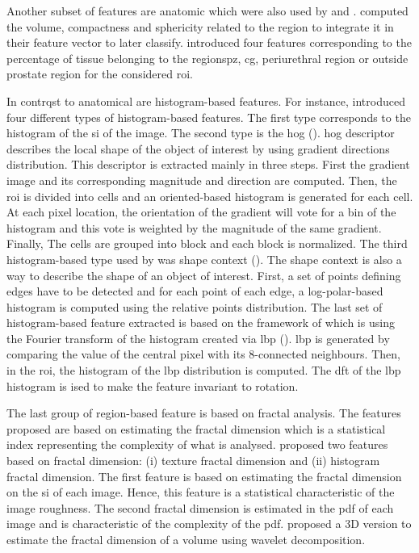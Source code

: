 \begin{enumerate}[leftmargin=*]
Another subset of features are anatomic which were also used by \cite{Litjens2012} and \cite{Matulewicz2013}. \cite{Litjens2012} computed the volume, compactness and sphericity related to the region to integrate it in their feature vector to later classify. \cite{Matulewicz2013} introduced four features corresponding to the percentage of tissue belonging to the regions\ac{pz}, \ac{cg}, periurethral region or outside prostate region for the considered \ac{roi}.

In contrqst to anatomical are histogram-based features. For instance, \cite{Liu2013} introduced four different types of histogram-based features. The first type corresponds to the histogram of the \ac{si} of the image. The second type is the \acf{hog} (\cite{Dalal2005}). \Ac{hog} descriptor describes the local shape of the object of interest by using gradient directions distribution. This descriptor is extracted mainly in three steps. First the gradient image and its corresponding magnitude and direction are computed. Then, the \ac{roi} is divided into cells and an oriented-based histogram is generated for each cell. At each pixel location, the orientation of the gradient will vote for a bin of the histogram and this vote is weighted by the magnitude of the same gradient. Finally, The cells are grouped into block and each block is normalized. The third histogram-based type used by \cite{Liu2013} was shape context (\cite{Belongie2002}). The shape context is also a way to describe the shape of an object of interest. First, a set of points defining edges have to be detected and for each point of each edge, a log-polar-based histogram is computed using the relative points distribution. The last set of histogram-based feature extracted is based on the framework of \cite{Zhao2012} which is using the Fourier transform of the histogram created via \acf{lbp} (\cite{Ojala1996}). \Ac{lbp} is generated by comparing the value of the central pixel with its 8-connected neighbours. Then, in the \ac{roi}, the histogram of the \ac{lbp} distribution is computed. The \acf{dft} of the \ac{lbp} histogram is ised to make the feature invariant to rotation.

The last group of region-based feature is based on fractal analysis. The features proposed are based on estimating the fractal dimension which is a statistical index representing the complexity of what is analysed. \cite{Lv2009} proposed two features based on fractal dimension: (i) texture fractal dimension and (ii) histogram fractal dimension. The first feature is based on estimating the fractal dimension on the \ac{si} of each image. Hence, this feature is a statistical characteristic of the image roughness. The second fractal dimension is estimated in the \ac{pdf} of each image and is characteristic of the complexity of the \ac{pdf}. \cite{Lopes2011} proposed a 3D version to estimate the fractal dimension of a volume using wavelet decomposition.
\end{enumerate}

